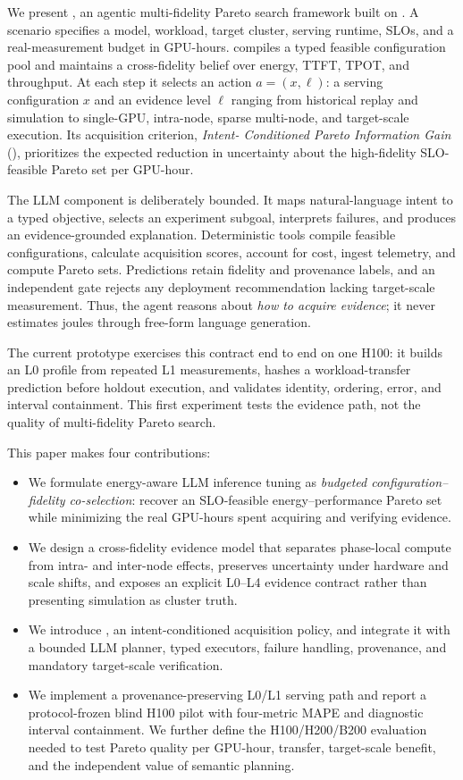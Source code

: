 We present \system{}, an agentic multi-fidelity Pareto search framework built on
\bench{}.  A scenario specifies a model, workload, target cluster, serving
runtime, SLOs, and a real-measurement budget in GPU-hours.  \system{} compiles a
typed feasible configuration pool and maintains a cross-fidelity belief over
energy, TTFT, TPOT, and throughput.  At each step it selects an action
$a=(x,\ell)$: a serving configuration $x$ and an evidence level $\ell$ ranging
from historical replay and simulation to single-GPU, intra-node, sparse
multi-node, and target-scale execution.  Its acquisition criterion, \emph{Intent-
Conditioned Pareto Information Gain} (\ipig{}), prioritizes the expected reduction
in uncertainty about the high-fidelity SLO-feasible Pareto set per GPU-hour.

The LLM component is deliberately bounded.  It maps natural-language intent to
a typed objective, selects an experiment subgoal, interprets failures, and
produces an evidence-grounded explanation.  Deterministic tools compile
feasible configurations, calculate acquisition scores, account for cost,
ingest telemetry, and compute Pareto sets.  Predictions retain fidelity and
provenance labels, and an independent gate rejects any deployment
recommendation lacking target-scale measurement.  Thus, the agent reasons
about \emph{how to acquire evidence}; it never estimates joules through
free-form language generation.

The current prototype exercises this contract end to end on one H100: it builds
an L0 profile from repeated L1 measurements, hashes a workload-transfer
prediction before holdout execution, and validates identity, ordering, error,
and interval containment.  This first experiment tests the evidence path, not
the quality of multi-fidelity Pareto search.

This paper makes four contributions:
\begin{itemize}
    \item We formulate energy-aware LLM inference tuning as \emph{budgeted
    configuration--fidelity co-selection}: recover an SLO-feasible
    energy--performance Pareto set while minimizing the real GPU-hours spent
    acquiring and verifying evidence.
    \item We design a cross-fidelity evidence model that separates phase-local
    compute from intra- and inter-node effects, preserves uncertainty under
    hardware and scale shifts, and exposes an explicit L0--L4 evidence
    contract rather than presenting simulation as cluster truth.
    \item We introduce \ipig{}, an intent-conditioned acquisition policy, and
    integrate it with a bounded LLM planner, typed executors, failure handling,
    provenance, and mandatory target-scale verification.
    \item We implement a provenance-preserving L0/L1 serving path and report a
    protocol-frozen blind H100 pilot with \PilotMeanMAPE{} four-metric MAPE and
    \PilotCoverage{} diagnostic interval containment.  We further define the
    H100/H200/B200 evaluation needed to test Pareto quality per GPU-hour,
    transfer, target-scale benefit, and the independent value of semantic
    planning.
\end{itemize}
